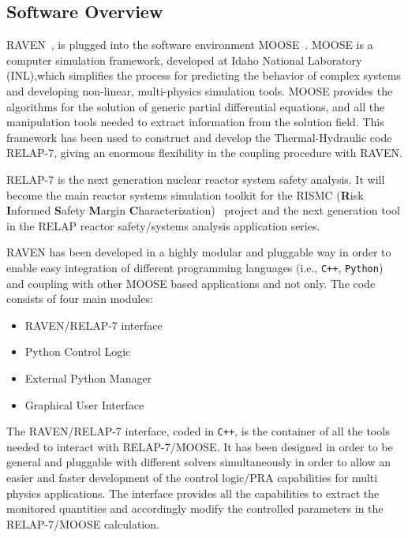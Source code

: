 \subsection{Software Overview}
RAVEN~\cite{alfonsiMC}, is plugged into the software environment MOOSE~\cite{MOOSE}. MOOSE is a computer simulation framework,  developed at Idaho National Laboratory (INL),which simplifies the process for predicting the behavior of complex systems and developing non-linear, multi-physics simulation tools. MOOSE provides the algorithms for the solution of generic partial differential equations, and all the manipulation tools needed to extract information from the solution field.  This framework has been used to construct and develop the Thermal-Hydraulic code RELAP-7, giving an enormous flexibility in the coupling procedure with RAVEN.

RELAP-7 is the next generation nuclear reactor system safety analysis. It will become the main reactor systems simulation toolkit for the RISMC (\textbf{R}isk \textbf{I}nformed \textbf{S}afety \textbf{M}argin \textbf{C}haracterization)~\cite{mandelliANS_RISMC} project and the next generation tool in the RELAP reactor safety/systems analysis application series. 

RAVEN has been developed in a highly modular and pluggable way in order to enable easy integration of different programming languages (i.e., \verb!C++!, \verb!Python!) and coupling with other MOOSE based applications and not only. The code consists of four main modules:
\vspace{-5mm}
\begin{itemize}
\itemsep0em
\item RAVEN/RELAP-7 interface
\item Python Control Logic 
\item External Python Manager
\item Graphical User Interface 
\end{itemize}
\vspace{-5mm}
The RAVEN/RELAP-7 interface, coded in \verb!C++!, is the container of all the tools needed to interact with RELAP-7/MOOSE. It has been designed in order to be general and pluggable with different solvers simultaneously in order to allow an easier and faster development of the control logic/PRA capabilities for multi physics applications.
The interface provides all the capabilities to extract the monitored quantities and accordingly modify the controlled parameters in the RELAP-7/MOOSE calculation.

